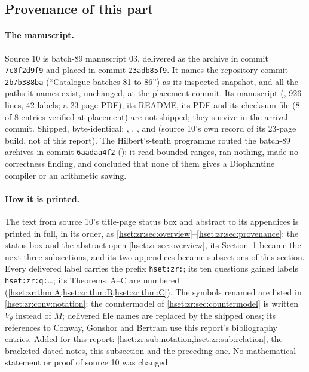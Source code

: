 \documentclass[11pt,letterpaper]{article}
\theoremstyle{definition}
\theoremstyle{remark}
\begin{document}
\subsection{Provenance of this part}
\label{hset:zr:sub:provenance}

\paragraph{The manuscript.} Source 10 is batch-89 manuscript 03, delivered as
the archive  in commit
\texttt{7c0f2d9f9} and placed in commit \texttt{23adb85f9}. It names the
repository commit \texttt{2b7b388ba} (``Catalogue batches 81 to 86'') as its
inspected snapshot, and all the paths it names exist, unchanged, at the
placement commit. Its manuscript (, 926 lines, 42 labels; a
23-page PDF), its README, its PDF and its checksum file 
(8 of 8 entries verified at placement) are not shipped; they survive in the
arrival commit. Shipped, byte-identical: ,
,
,
 and
 (source 10's own record
of its 23-page build, not of this report). The Hilbert's-tenth programme
routed the batch-89 archives in commit \texttt{6aadaa4f2}
():
it read bounded ranges, ran nothing, made no correctness finding, and
concluded that none of them gives a Diophantine compiler or an arithmetic
saving.

\paragraph{How it is printed.} The text from source 10's title-page status box
and abstract to its appendices is printed in full, in its order, as
\cref{hset:zr:sec:overview}--\cref{hset:zr:sec:provenance}: the status box and
the abstract open \cref{hset:zr:sec:overview}, its Section~1 became the next
three subsections, and its two appendices became subsections of this section. Every delivered label carries
the prefix \texttt{hset:zr:}; its ten questions gained labels
\texttt{hset:zr:q:}\dots; its Theorems~A--C are numbered
(\cref{hset:zr:thm:A,hset:zr:thm:B,hset:zr:thm:C}). The symbols renamed are
listed in \cref{hset:zr:conv:notation}; the countermodel of
\cref{hset:zr:sec:countermodel} is written $V_\theta$ instead of $M$; delivered
file names are replaced by the shipped ones; its references to Conway, Gonshor
and Bertram use this report's bibliography entries. Added for this report:
\cref{hset:zr:sub:notation,hset:zr:sub:relation}, the bracketed dated notes,
this subsection and the preceding one. No mathematical statement or proof of
source 10 was changed.
\end{document}
